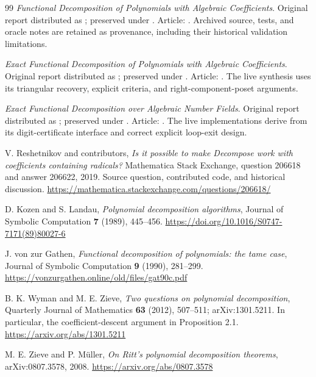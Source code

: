 \documentclass[11pt,a4paper]{article}
\numberwithin{equation}{section}
\theoremstyle{definition}
\theoremstyle{remark}
\begin{document}
\begingroup
\raggedright
\begin{thebibliography}{99}
\emph{Functional Decomposition of Polynomials with Algebraic Coefficients}.
Original report distributed as ;
preserved under .
Article: . Archived source, tests, and oracle notes
are retained as provenance, including their historical validation limitations.

\emph{Exact Functional Decomposition of Polynomials with Algebraic Coefficients}.
Original report distributed as ;
preserved under .
Article: .
The live synthesis uses its triangular recovery, explicit criteria,
and right-component-poset arguments.

\emph{Exact Functional Decomposition over Algebraic Number Fields}.
Original report distributed as ;
preserved under .
Article: .
The live implementations derive from its digit-certificate interface and
correct explicit loop-exit design.

V. Reshetnikov and contributors,
\emph{Is it possible to make Decompose work with coefficients containing
radicals?} Mathematica Stack Exchange, question 206618 and answer 206622,
2019. Source question, contributed code, and historical discussion.
\url{https://mathematica.stackexchange.com/questions/206618/}

D. Kozen and S. Landau,
\emph{Polynomial decomposition algorithms},
Journal of Symbolic Computation \textbf{7} (1989), 445--456.
\url{https://doi.org/10.1016/S0747-7171(89)80027-6}

J. von zur Gathen,
\emph{Functional decomposition of polynomials: the tame case},
Journal of Symbolic Computation \textbf{9} (1990), 281--299.
\url{https://vonzurgathen.online/old/files/gat90c.pdf}

B. K. Wyman and M. E. Zieve,
\emph{Two questions on polynomial decomposition},
Quarterly Journal of Mathematics \textbf{63} (2012), 507--511;
arXiv:1301.5211.
In particular, the coefficient-descent argument in Proposition 2.1.
\url{https://arxiv.org/abs/1301.5211}

M. E. Zieve and P. M\"uller,
\emph{On Ritt's polynomial decomposition theorems}, arXiv:0807.3578, 2008.
\url{https://arxiv.org/abs/0807.3578}


\end{thebibliography}
\end{document}
